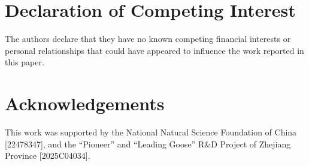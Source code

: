 \documentclass[a4paper,fleqn]{cas-dc}
\begin{document}
\section*{Declaration of Competing Interest}
The authors declare that they have no known competing financial interests or personal relationships that could have appeared to influence the work reported in this paper.

\section*{Acknowledgements}
This work was supported by the National Natural Science Foundation of China [22478347], and the ``Pioneer'' and ``Leading Goose'' R\&D Project of Zhejiang Province [2025C04034].

\printcredits

%





\end{document}
